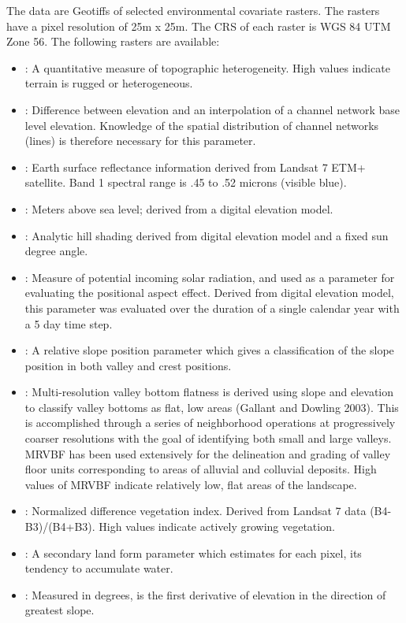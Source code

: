 \documentclass[a4paper]{book}
\begin{document}
\begin{Format}

The data are Geotiffs of selected environmental covariate rasters. The rasters have a pixel resolution of 25m x 25m. The CRS of each raster is WGS 84 UTM Zone 56. The following rasters are available:

\begin{itemize}

\item{} : A quantitative measure of topographic heterogeneity. High values indicate terrain is rugged or heterogeneous.  
\item{} : Difference between elevation and an interpolation of a channel network base level elevation. Knowledge of the spatial distribution of channel networks (lines) is therefore necessary for this parameter.
\item{} : Earth surface reflectance information derived from Landsat 7 ETM+ satellite. Band 1 spectral range is .45 to .52 microns (visible blue).
\item{} : Meters above sea level; derived from a digital elevation model.
\item{} : Analytic hill shading derived from digital elevation model and a fixed sun degree angle.
\item{} : Measure of potential incoming solar radiation, and used as a parameter for evaluating the positional aspect effect. Derived from digital elevation model, this parameter was evaluated over the duration of a single calendar year with a 5 day time step.
\item{} : A relative slope position parameter which gives a classification of the slope position in both valley and crest positions.
\item{} : Multi-resolution valley bottom flatness is derived using slope and elevation to classify valley bottoms as flat, low areas (Gallant and Dowling 2003). This is accomplished through a series of neighborhood operations at progressively coarser resolutions with the goal of identifying both small and large valleys. MRVBF has been used extensively for the delineation and grading of valley floor units corresponding to areas of alluvial and colluvial deposits. High values of MRVBF indicate relatively low, flat areas of the landscape.
\item{} : Normalized difference vegetation index. Derived from Landsat 7 data (B4-B3)/(B4+B3). High values indicate actively growing vegetation.
\item{} : A secondary land form parameter which estimates for each pixel, its tendency to accumulate water.
\item{} : Measured in degrees, is the first derivative of elevation in the direction of greatest slope.       

\end{itemize}

\end{Format}
\end{document}
